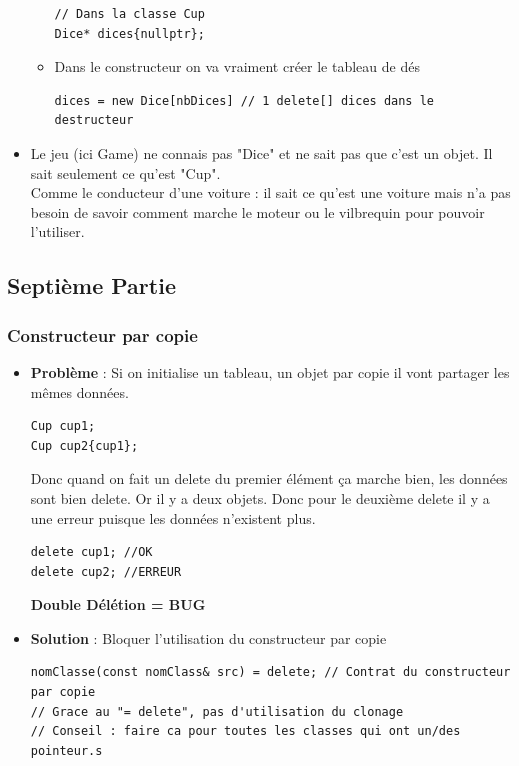 \documentclass[12pt,a4paper]{article}
\begin{document}
\begin{itemize}
\begin{itemize}
\begin{lstlisting}
// Dans la classe Cup
Dice* dices{nullptr};
\end{lstlisting}
\item Dans le constructeur on va vraiment créer le tableau de dés
\begin{lstlisting}
dices = new Dice[nbDices] // 1 delete[] dices dans le destructeur
\end{lstlisting}
\end{itemize}
\item Le jeu (ici Game) ne connais pas "Dice" et ne sait pas que c'est un objet. Il sait seulement ce qu'est "Cup".\\
Comme le conducteur d'une voiture : il sait ce qu'est une voiture mais n'a pas besoin de savoir comment marche le moteur ou le vilbrequin pour pouvoir l'utiliser.
\end{itemize}

\subsection{Septième Partie}
\subsubsection{Constructeur par copie}
\begin{itemize}
\item \textbf{Problème} : Si on initialise un tableau, un objet par copie il vont partager les mêmes données.
\begin{lstlisting}
Cup cup1;
Cup cup2{cup1};
\end{lstlisting}
Donc quand on fait un delete du premier élément ça marche bien, les données sont bien delete. Or il y a deux objets. Donc pour le deuxième delete il y a une erreur puisque les données n'existent plus.
\begin{lstlisting}
delete cup1; //OK
delete cup2; //ERREUR
\end{lstlisting} \textbf{Double Délétion = BUG}
\end{itemize}
\begin{itemize}
\item \textbf{Solution} : Bloquer l'utilisation du constructeur par copie 
\begin{lstlisting}
nomClasse(const nomClass& src) = delete; // Contrat du constructeur par copie 
// Grace au "= delete", pas d'utilisation du clonage
// Conseil : faire ca pour toutes les classes qui ont un/des pointeur.s
\end{lstlisting}
\end{itemize}
\end{document}
